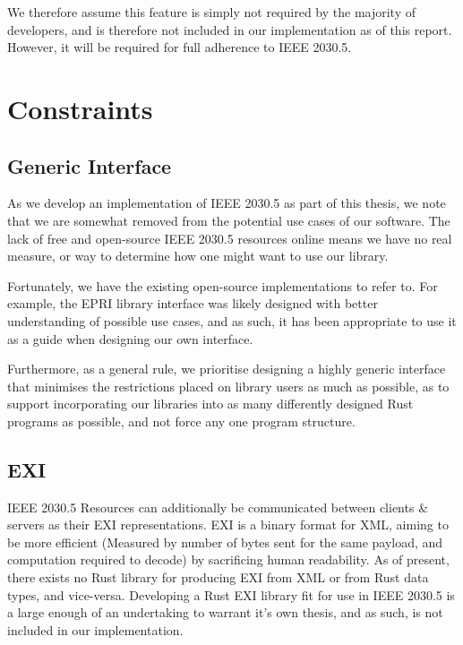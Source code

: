 We therefore assume this feature is simply not required by the majority of developers, and is therefore not included in our implementation as of this report. However, it will be required for full adherence to IEEE 2030.5.

\section{Constraints}

\subsection{Generic Interface}
As we develop an implementation of IEEE 2030.5 as part of this thesis, we note that we are somewhat removed from the potential use cases of our software. The lack of free and open-source IEEE 2030.5 resources online means we have no real measure, or way to determine how one might want to use our library. 

Fortunately, we have the existing open-source implementations to refer to. For example, the EPRI library interface was likely designed with better understanding of possible use cases, and as such, it has been appropriate to use it as a guide when designing our own interface.

Furthermore, as a general rule, we prioritise designing a highly generic interface that minimises the restrictions placed on library users as much as possible, as to support incorporating our libraries into as many differently designed Rust programs as possible, and not force any one program structure.

\subsection{EXI}
IEEE 2030.5 Resources can additionally be communicated between clients \& servers as their EXI representations. EXI is a binary format for XML, aiming to be more efficient (Measured by number of bytes sent for the same payload, and computation required to decode) by sacrificing human readability. As of present, there exists no Rust library for producing EXI from XML or from Rust data types, and vice-versa.
Developing a Rust EXI library fit for use in IEEE 2030.5 is a large enough of an undertaking to warrant it's own thesis, and as such, is not included in our implementation.